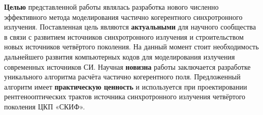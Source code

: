 
\textbf{Целью} представленной работы являлась разработка нового численно эффективного метода моделирования частично когерентного синхротронного излучения. Поставленная цель являются \textbf{актуальными} для научного сообщества в связи с развитием источников синхротронного излучения и строительством новых источников четвёртого поколения. На данный момент стоит необходимость дальнейшего развития компьютерных кодов для моделирования излучения современных источников СИ. Научная \textbf{новизна} работы заключается разработке уникального алгоритма расчёта частично когерентного поля. Предложенный алгоритм имеет \textbf{практическую ценность} и используется при проектировании рентгенооптических трактов источника синхротронного излучения четвёртого поколения ЦКП «СКИФ». 


%
%




